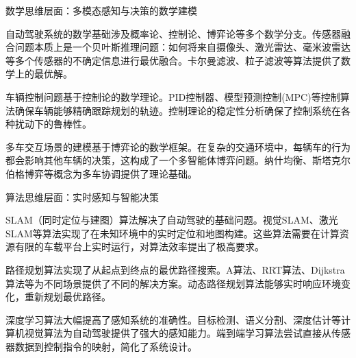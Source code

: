 数学思维层面：多模态感知与决策的数学建模

自动驾驶系统的数学基础涉及概率论、控制论、博弈论等多个数学分支。传感器融合问题本质上是一个贝叶斯推理问题：如何将来自摄像头、激光雷达、毫米波雷达等多个传感器的不确定信息进行最优融合。卡尔曼滤波、粒子滤波等算法提供了数学上的最优解。

车辆控制问题基于控制论的数学理论。PID控制器、模型预测控制(MPC)等控制算法确保车辆能够精确跟踪规划的轨迹。控制理论的稳定性分析确保了控制系统在各种扰动下的鲁棒性。

多车交互场景的建模基于博弈论的数学框架。在复杂的交通环境中，每辆车的行为都会影响其他车辆的决策，这构成了一个多智能体博弈问题。纳什均衡、斯塔克尔伯格博弈等概念为多车协调提供了理论基础。

算法思维层面：实时感知与智能决策

SLAM（同时定位与建图）算法解决了自动驾驶的基础问题。视觉SLAM、激光SLAM等算法实现了在未知环境中的实时定位和地图构建。这些算法需要在计算资源有限的车载平台上实时运行，对算法效率提出了极高要求。

路径规划算法实现了从起点到终点的最优路径搜索。A算法、RRT算法、Dijkstra算法等为不同场景提供了不同的解决方案。动态路径规划算法能够实时响应环境变化，重新规划最优路径。

深度学习算法大幅提高了感知系统的准确性。目标检测、语义分割、深度估计等计算机视觉算法为自动驾驶提供了强大的感知能力。端到端学习算法尝试直接从传感器数据到控制指令的映射，简化了系统设计。

